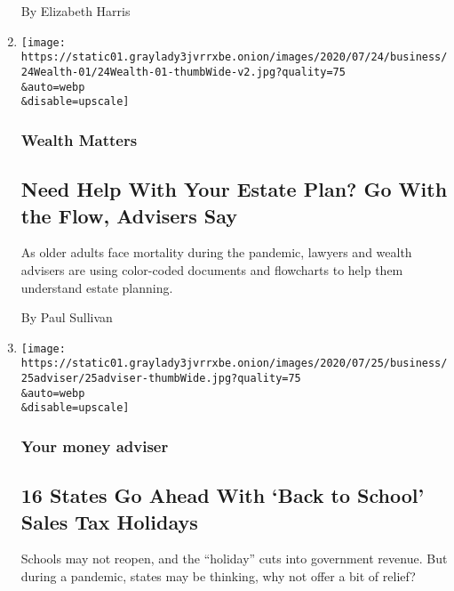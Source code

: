 \begin{enumerate}
  By Elizabeth Harris
\item
  \href{/2020/07/24/your-money/need-help-with-your-estate-plan-go-with-the-flow-advisers-say.html}{}

  \texttt{[image: https://static01.graylady3jvrrxbe.onion/images/2020/07/24/business/24Wealth-01/24Wealth-01-thumbWide-v2.jpg?quality=75\\\&auto=webp\\\&disable=upscale]}

  \hypertarget{wealth-matters-1}{%
  \subsubsection{Wealth Matters}\label{wealth-matters-1}}

  \hypertarget{need-help-with-your-estate-plan-go-with-the-flow-advisers-say}{%
  \subsection{Need Help With Your Estate Plan? Go With the Flow,
  Advisers
  Say}\label{need-help-with-your-estate-plan-go-with-the-flow-advisers-say}}

  As older adults face mortality during the pandemic, lawyers and wealth
  advisers are using color-coded documents and flowcharts to help them
  understand estate planning.

  By Paul Sullivan
\item
  \href{/2020/07/24/your-money/back-to-school-tax-holiday-coronavirus.html}{}

  \texttt{[image: https://static01.graylady3jvrrxbe.onion/images/2020/07/25/business/25adviser/25adviser-thumbWide.jpg?quality=75\\\&auto=webp\\\&disable=upscale]}

  \hypertarget{your-money-adviser}{%
  \subsubsection{Your money adviser}\label{your-money-adviser}}

  \hypertarget{16-states-go-ahead-with-back-to-school-sales-tax-holidays}{%
  \subsection{16 States Go Ahead With `Back to School' Sales Tax
  Holidays}\label{16-states-go-ahead-with-back-to-school-sales-tax-holidays}}

  Schools may not reopen, and the ``holiday'' cuts into government
  revenue. But during a pandemic, states may be thinking, why not offer
  a bit of relief?


\end{enumerate}
